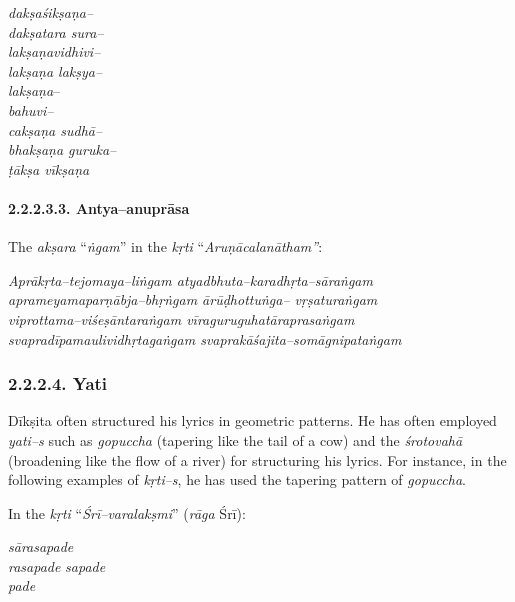 \begin{myquote}
\textit{dakṣaśikṣaṇa–}\\\textit{dakṣatara sura–}\\\textit{lakṣaṇavidhivi–}\\\textit{lakṣaṇa lakṣya–}\\\textit{lakṣaṇa}–\\\textit{bahuvi–}\\\textit{cakṣaṇa sudhā–}\\\textit{bhakṣaṇa guruka–}\\\textit{ṭākṣa vīkṣaṇa}
\end{myquote}


\paragraph*{2.2.2.3.3. Antya–anuprāsa}

The \textit{akṣara} “\textit{ṅgam}” in the \textit{kṛti} “\textit{Aruṇācalanātham”}:

\begin{myquote}
\textit{Aprākṛta–tejomaya–liṅgam atyadbhuta–karadhṛta–sāraṅgam}\\\textit{aprameyamaparṇābja–bhṛṅgam ārūḍhottuṅga– vṛṣaturaṅgam}\\\textit{viprottama–viśeṣāntaraṅgam vīraguruguhatāraprasaṅgam}\\\textit{svapradīpamaulividhṛtagaṅgam svaprakāśajita–somāgnipataṅgam}
\end{myquote}



\subsubsection*{2.2.2.4. Yati}

Dīkṣita often structured his lyrics in geometric patterns. He has often employed \textit{yati–s} such as \textit{gopuccha} (tapering like the tail of a cow) and the \textit{śrotovahā} (broadening like the flow of a river) for structuring his lyrics. For instance, in the following examples of \textit{kṛti–s}, he has used the tapering pattern of \textit{gopuccha}.

In the \textit{kṛti} “\textit{Śrī–varalakṣmi}” (\textit{rāga} Śrī):

\begin{myquote}
\textit{sārasapade}\\\textit{rasapade} \textit{sapade}\\\textit{pade}
\end{myquote}

